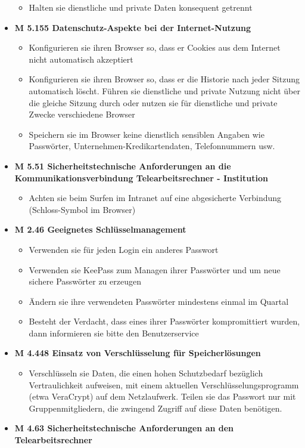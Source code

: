 \documentclass[]{article}
\begin{document}
\begin{itemize}
  \begin{itemize}
  \item
    Halten sie dienstliche und private Daten konsequent getrennt
  \end{itemize}
\item
  \textbf{M 5.155 Datenschutz-Aspekte bei der Internet-Nutzung}

  \begin{itemize}
  \item
    Konfigurieren sie ihren Browser so, dass er Cookies aus dem Internet
    nicht automatisch akzeptiert
  \item
    Konfigurieren sie ihren Browser so, dass er die Historie nach jeder
    Sitzung automatisch löscht. Führen sie dienstliche und private
    Nutzung nicht über die gleiche Sitzung durch oder nutzen sie für
    dienstliche und private Zwecke verschiedene Browser
  \item
    Speichern sie im Browser keine dienstlich sensiblen Angaben wie
    Passwörter, Unternehmen-Kredikartendaten, Telefonnummern usw.
  \end{itemize}
\item
  \textbf{M 5.51 Sicherheitstechnische Anforderungen an die
  Kommunikationsverbindung Telearbeitsrechner - Institution}

  \begin{itemize}
  \item
    Achten sie beim Surfen im Intranet auf eine abgesicherte Verbindung
    (Schloss-Symbol im Browser)
  \end{itemize}
\item
  \textbf{M 2.46 Geeignetes Schlüsselmanagement}

  \begin{itemize}
  \item
    Verwenden sie für jeden Login ein anderes Passwort
  \item
    Verwenden sie KeePass zum Managen ihrer Passwörter und um neue
    sichere Passwörter zu erzeugen
  \item
    Ändern sie ihre verwendeten Passwörter mindestens einmal im Quartal
  \item
    Besteht der Verdacht, dass eines ihrer Passwörter kompromittiert
    wurden, dann informieren sie bitte den Benutzerservice
  \end{itemize}
\item
  \textbf{M 4.448 Einsatz von Verschlüsselung für Speicherlösungen}

  \begin{itemize}
  \item
    Verschlüsseln sie Daten, die einen hohen Schutzbedarf bezüglich
    Vertraulichkeit aufweisen, mit einem aktuellen
    Verschlüsselungsprogramm (etwa VeraCrypt) auf dem Netzlaufwerk.
    Teilen sie das Passwort nur mit Gruppenmitgliedern, die zwingend
    Zugriff auf diese Daten benötigen.
  \end{itemize}
\item
  \textbf{M 4.63 Sicherheitstechnische Anforderungen an den
  Telearbeitsrechner}


\end{itemize}
\end{document}
